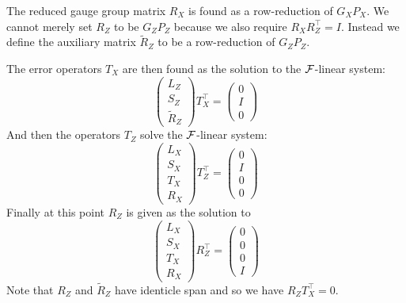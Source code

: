 The reduced gauge group matrix $R_X$
is found as a row-reduction of $G_X P_X.$
We cannot merely set $R_Z$ to be $G_Z P_Z$ 
because we also require $R_X R_Z^\top = I.$
Instead we define the auxiliary matrix
$\widetilde{R}_Z$ to be a row-reduction of  $G_Z P_Z.$

The error operators $T_X$ are then found as the solution
to the $\mathcal{F}$-linear system:
$$
\left( \begin{array}{l}
L_Z\\
S_Z\\
\widetilde{R}_Z
\end{array} \right)
T_X^\top = 
\left( \begin{array}{l}
0\\
I\\
0
\end{array} \right)
$$
And then the operators $T_Z$ solve the $\mathcal{F}$-linear system:
$$
\left( \begin{array}{l}
L_X\\
S_X\\
T_X\\
R_X
\end{array} \right)
T_Z^\top = 
\left( \begin{array}{l}
0\\
I\\
0\\
0
\end{array} \right)
$$
Finally at this point $R_Z$ is given as the solution to
$$
\left( \begin{array}{l}
L_X\\
S_X\\
T_X\\
R_X
\end{array} \right)
R_Z^\top = 
\left( \begin{array}{l}
0\\
0\\
0\\
I
\end{array} \right)
$$
Note that $R_Z$ and $\widetilde{R}_Z$ have identicle span 
and so we have $R_Z T_X^\top = 0.$

